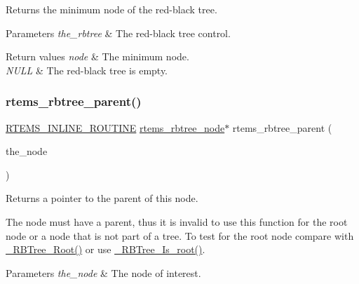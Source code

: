 Returns the minimum node of the red-\/black tree. 


\begin{DoxyParams}{Parameters}
{\em the\+\_\+rbtree} & The red-\/black tree control.\\
\hline
\end{DoxyParams}

\begin{DoxyRetVals}{Return values}
{\em node} & The minimum node. \\
\hline
{\em N\+U\+LL} & The red-\/black tree is empty. \\
\hline
\end{DoxyRetVals}
\mbox{\label{group__ClassicRBTrees_ga78ab85b5893639aba788eac56a2c4b83}} 
\subsubsection{\texorpdfstring{rtems\_rbtree\_parent()}{rtems\_rbtree\_parent()}}
{\footnotesize\ttfamily \mbox{\hyperlink{group__RTEMSScoreBaseDefs_gac216239df231d5dbd15e3520b0b9313f}{R\+T\+E\+M\+S\+\_\+\+I\+N\+L\+I\+N\+E\+\_\+\+R\+O\+U\+T\+I\+NE}} \mbox{\hyperlink{group__ClassicRBTrees_gaef47fc7fc61856c9afbf7f18a26ff80d}{rtems\+\_\+rbtree\+\_\+node}}$\ast$ rtems\+\_\+rbtree\+\_\+parent (\begin{DoxyParamCaption}\item[{const \mbox{\hyperlink{group__ClassicRBTrees_gaef47fc7fc61856c9afbf7f18a26ff80d}{rtems\+\_\+rbtree\+\_\+node}} $\ast$}]{the\+\_\+node }\end{DoxyParamCaption})}



Returns a pointer to the parent of this node. 

The node must have a parent, thus it is invalid to use this function for the root node or a node that is not part of a tree. To test for the root node compare with \mbox{\hyperlink{group__RTEMSScoreRBTree_ga29242f056330aaabc12dcfcaa6f10a05}{\+\_\+\+R\+B\+Tree\+\_\+\+Root()}} or use \mbox{\hyperlink{group__RTEMSScoreRBTree_ga8496286f0a637353c8046e0d2625ea08}{\+\_\+\+R\+B\+Tree\+\_\+\+Is\+\_\+root()}}.


\begin{DoxyParams}{Parameters}
{\em the\+\_\+node} & The node of interest.\\
\hline
\end{DoxyParams}


